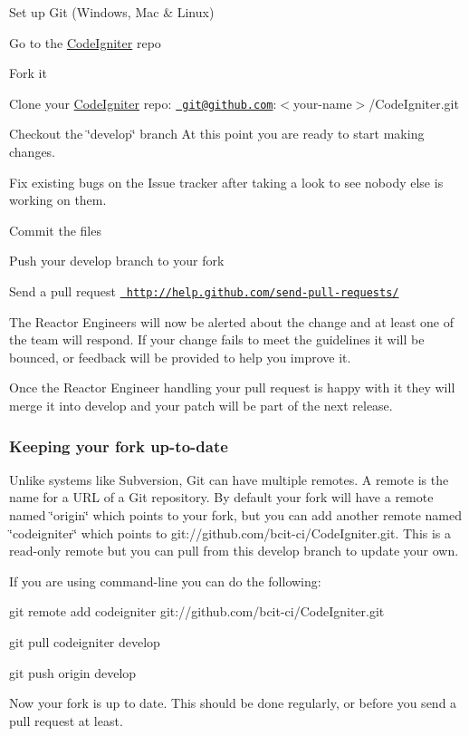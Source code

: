 \begin{DoxyEnumerate}
\item Set up Git (Windows, Mac \& Linux)
\item Go to the \mbox{\hyperlink{namespace_code_igniter}{Code\+Igniter}} repo
\item Fork it
\item Clone your \mbox{\hyperlink{namespace_code_igniter}{Code\+Igniter}} repo\+: \href{mailto:git@github.com}{\texttt{ git@github.\+com}}\+:$<$your-\/name$>$/\+Code\+Igniter.git
\item Checkout the \char`\"{}develop\char`\"{} branch At this point you are ready to start making changes.
\item Fix existing bugs on the Issue tracker after taking a look to see nobody else is working on them.
\item Commit the files
\item Push your develop branch to your fork
\item Send a pull request \href{http://help.github.com/send-pull-requests/}{\texttt{ http\+://help.\+github.\+com/send-\/pull-\/requests/}}
\end{DoxyEnumerate}

The Reactor Engineers will now be alerted about the change and at least one of the team will respond. If your change fails to meet the guidelines it will be bounced, or feedback will be provided to help you improve it.

Once the Reactor Engineer handling your pull request is happy with it they will merge it into develop and your patch will be part of the next release.

\subsubsection*{Keeping your fork up-\/to-\/date}

Unlike systems like Subversion, Git can have multiple remotes. A remote is the name for a U\+RL of a Git repository. By default your fork will have a remote named \char`\"{}origin\char`\"{} which points to your fork, but you can add another remote named \char`\"{}codeigniter\char`\"{} which points to {\ttfamily git\+://github.com/bcit-\/ci/\+Code\+Igniter.\+git}. This is a read-\/only remote but you can pull from this develop branch to update your own.

If you are using command-\/line you can do the following\+:


\begin{DoxyEnumerate}
\item {\ttfamily git remote add codeigniter git\+://github.com/bcit-\/ci/\+Code\+Igniter.\+git}
\item {\ttfamily git pull codeigniter develop}
\item {\ttfamily git push origin develop}
\end{DoxyEnumerate}

Now your fork is up to date. This should be done regularly, or before you send a pull request at least. 